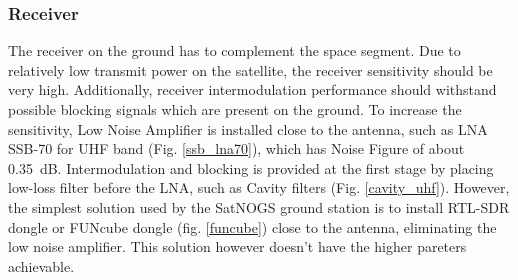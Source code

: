 \subsubsection{Receiver}
The receiver on the ground has to complement the space segment. Due to relatively low transmit power on the satellite, the receiver sensitivity should be very high. Additionally, receiver intermodulation performance should withstand possible blocking signals which are present on the ground. To increase the sensitivity, Low Noise Amplifier is installed close to the antenna, such as LNA SSB-70 for UHF band (Fig. \ref{ssb_lna70}), which has Noise Figure of about \SI{0.35}{\dB}. Intermodulation and blocking is provided at the first stage by placing low-loss filter before the LNA, such as Cavity filters (Fig. \ref{cavity_uhf}). However, the simplest solution used by the SatNOGS ground station is to install RTL-SDR dongle or FUNcube dongle (fig. \ref{funcube}) close to the antenna, eliminating the low noise amplifier. This solution however doesn't have the higher pareters achievable.

